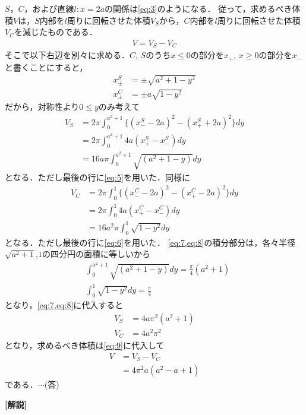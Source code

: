 \documentclass[a4paper,10pt]{ltjsarticle}
\begin{document}
\begin{multicols}{2}
$S$，$C$，および直線$l:x=2a$の関係は\cref{eq:3}のようになる．
従って，求めるべき体積$V$は，$S$内部を$l$周りに回転させた体積$V_S$から，$C$内部を$l$周りに回転させた体積$V_C$を減じたものである．
\begin{align}
  V = V_S - V_C\label{eq:9}
\end{align}
そこで以下右辺を別々に求める．$C$, $S$のうち$x\le 0$の部分を$x_{+}$, $x\ge 0$の部分を$x_{-}$と書くことにすると，
\begin{align}
  x^{S}_{\pm} &= \pm \sqrt{a^2+1-y^2} \label{eq:5} \\
  x^{C}_{\pm} &= \pm a\sqrt{1-y^2} \label{eq:6}
\end{align}
だから，対称性より$0\le y$のみ考えて
\begin{align}
  V_S 
&= 2\pi \int_{0}^{a^2+1} \{(x^{S}_{-} - 2a)^2 - (x^{S}_{+} + 2a)^2\} dy \nonumber \\
&= 2\pi \int_{0}^{a^2+1} 4a(x^{S}_{+} - x^{S}_{-}) dy \nonumber \\
&= 16a\pi \int_{0}^{a^2+1} \sqrt{(a^2+1-y)} dy \label{eq:7}
\end{align}
となる．ただし最後の行に\cref{eq:5}を用いた．同様に
\begin{align}
 V_C 
 &= 2\pi \int_{0}^{1} \{(x^{C}_{-} - 2a)^2 - (x^{C}_{+} - 2a)^2\} dy \nonumber \\ 
 &= 2\pi \int_{0}^{1} 4a(x^{C}_{+} - x^{C}_{-}) dy \nonumber \\ 
 &= 16a^2\pi \int_{0}^{1} \sqrt{1-y^2} dy \label{eq:8}
\end{align}
となる．ただし最後の行に\cref{eq:6}を用いた．
\cref{eq:7,eq:8}の積分部分は，各々半径$\sqrt{a^2+1}$,$1$の四分円の面積に等しいから
\begin{align}
  &\int_{0}^{a^2+1} \sqrt{(a^2+1-y)} dy = \frac{\pi}{4}(a^2+1) \\
  &\int_{0}^{1} \sqrt{1-y^2} dy = \frac{\pi}{4}
\end{align}
となり，\cref{eq:7,eq:8}に代入すると
\begin{align}
  V_S &= 4a\pi^2 (a^2+1) \\
  V_C &= 4a^2\pi^2 
\end{align}
となり，求めるべき体積は\cref{eq:9}に代入して
\begin{align}
  V 
  &= V_S - V_C \\
  &= 4\pi^2a (a^2-a+1)
\end{align}
である．$\cdots$(答)


\vspace{10pt}
{\bf[解説]}


\end{multicols}
\end{document}
